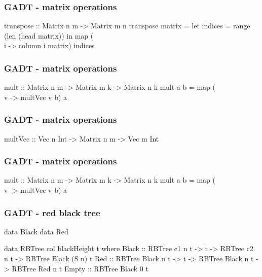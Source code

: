 \documentclass{beamer}
\newenvironment{VerbExample}
{\example\semiverbatim}
{\endsemiverbatim\endexample}
\begin{document}
\begin{frame}[fragile]
  \frametitle{GADT - matrix operations}
  \begin{VerbExample}
transpose :: Matrix n m -> Matrix m n
transpose matrix =
  let indices = range (len (head matrix)) in
  map (\\i -> column i matrix) indices
  \end{VerbExample}
\end{frame}

\begin{frame}[fragile]
  \frametitle{GADT - matrix operations}
  \begin{VerbExample}
mult :: Matrix n m -> Matrix m k -> Matrix n k
mult a b = map (\\v -> multVec v b) a
  \end{VerbExample}
\end{frame}

\begin{frame}[fragile]
  \frametitle{GADT - matrix operations}
  \begin{VerbExample}
multVec :: Vec n Int -> Matrix n m -> Vec m Int
  \end{VerbExample}
\end{frame}

\begin{frame}[fragile]
  \frametitle{GADT - matrix operations}
  \begin{VerbExample}
mult :: Matrix n m -> Matrix m k -> Matrix n k
mult a b = map (\\v -> multVec v b) a
  \end{VerbExample}
\end{frame}

\begin{frame}[fragile]
  \frametitle{GADT - red black tree}
  \begin{VerbExample}
data Black
data Red

data RBTree col blackHeight t where
  Black :: RBTree c1 n t ->
           t ->
           RBTree c2 n t ->
           RBTree Black (S n) t
  Red :: RBTree Black n t ->
         t ->
         RBTree Black n t ->
         RBTree Red n t
  Empty :: RBTree Black 0 t
  \end{VerbExample}
\end{frame}
\end{document}
